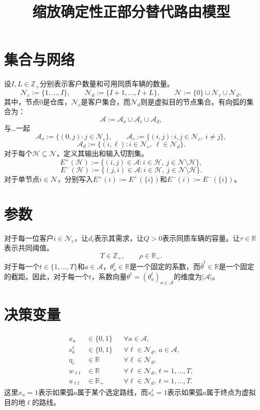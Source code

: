 \documentclass[11pt]{article}
\title{缩放确定性正部分替代路由模型}
\author{}
\date{}
\begin{document}
\maketitle

\section{集合与网络}

设$I,L\in\mathbb{Z}_{+}$分别表示客户数量和可用同质车辆的数量。
\[
\mathcal{N}_c:=\{1,\ldots,I\},
\qquad
\mathcal{N}_d:=\{I+1,\ldots,I+L\},
\qquad
\mathcal{N}:=\{0\}\cup\mathcal{N}_c\cup\mathcal{N}_d,
\]
其中，节点$0$是仓库，$\mathcal{N}_c$是客户集合，而$\mathcal{N}_d$则是虚拟目的节点集合。有向弧的集合为：
\[
\mathcal{A}:=\mathcal{A}_o\cup\mathcal{A}_c\cup\mathcal{A}_d,
\]
与…一起
\[
\mathcal{A}_o:=\{(0,j):j\in\mathcal{N}_c\},
\qquad
\mathcal{A}_c:=\{(i,j):i,j\in\mathcal{N}_c,\ i\neq j\},
\]
\[
\mathcal{A}_d:=\{(i,\ell):i\in\mathcal{N}_c,\ \ell\in\mathcal{N}_d\}.
\]
对于每个$\mathcal{H}\subseteq\mathcal{N}$，定义其输出和输入切割集。
\[
E^+(\mathcal{H})
:=\{(i,j)\in\mathcal{A}:i\in\mathcal{H},\ j\in\mathcal{N}\setminus\mathcal{H}\},
\]
\[
E^-(\mathcal{H})
:=\{(j,i)\in\mathcal{A}:i\in\mathcal{H},\ j\in\mathcal{N}\setminus\mathcal{H}\}.
\]
对于单节点$i\in\mathcal{N}$，分别写入$E^+(i):=E^+(\{i\})$和$E^-(i):=E^-(\{i\})$。

\section{参数}

对于每一位客户$i\in\mathcal{N}_c$，让$d_i$表示其需求，让$Q>0$表示同质车辆的容量。让$\tau\in\mathbb{R}$表示共同阈值。
\[
T\in\mathbb{Z}_{+},
\qquad
\rho\in\mathbb{R}_{+}.
\]
对于每一个$t\in\{1,\ldots,T\}$和$a\in\mathcal{A}$，$\theta_a^t\in\mathbb{R}$是一个固定的系数，而$\bar\theta^t\in\mathbb{R}$是一个固定的截距。因此，对于每一个$t$，系数向量$\theta^t=(\theta_a^t)_{a\in\mathcal{A}}$的维度为$|\mathcal{A}|$。

\section{决策变量}

\begin{align*}
x_a&\in\{0,1\} && \forall a\in\mathcal{A},\\
s_a^\ell&\in\{0,1\} && \forall \ell\in\mathcal{N}_d,\ a\in\mathcal{A},\\
\eta_\ell&\in\mathbb{R} && \forall \ell\in\mathcal{N}_d,\\
w_{\ell t}&\in\mathbb{R} && \forall \ell\in\mathcal{N}_d,\ t=1,\ldots,T,\\
u_{\ell t}&\in\mathbb{R}_{+} && \forall \ell\in\mathcal{N}_d,\ t=1,\ldots,T.
\end{align*}
这里$x_a=1$表示如果弧$a$属于某个选定路线，而$s_a^\ell=1$表示如果弧$a$属于终点为虚拟目的地$\ell$的路线。
\end{document}
